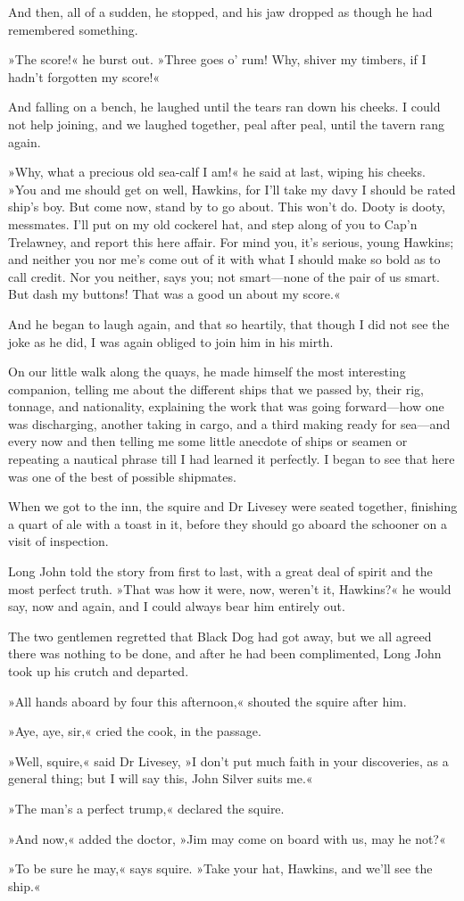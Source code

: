 And then, all of a sudden, he stopped, and his jaw dropped as though he had remembered something.

»The score!« he burst out. »Three goes o' rum! Why, shiver my timbers, if I hadn't forgotten my score!«

And falling on a bench, he laughed until the tears ran down his cheeks. I could not help joining, and we laughed together, peal after peal, until the tavern rang again.

»Why, what a precious old sea-calf I am!« he said at last, wiping his cheeks. »You and me should get on well, Hawkins, for I'll take my davy I should be rated ship's boy. But come now, stand by to go about. This won't do. Dooty is dooty, messmates. I'll put on my old cockerel hat, and step along of you to Cap'n Trelawney, and report this here affair. For mind you, it's serious, young Hawkins; and neither you nor me's come out of it with what I should make so bold as to call credit. Nor you neither, says you; not smart—none of the pair of us smart. But dash my buttons! That was a good un about my score.«

And he began to laugh again, and that so heartily, that though I did not see the joke as he did, I was again obliged to join him in his mirth.

On our little walk along the quays, he made himself the most interesting companion, telling me about the different ships that we passed by, their rig, tonnage, and nationality, explaining the work that was going forward—how one was discharging, another taking in cargo, and a third making ready for sea—and every now and then telling me some little anecdote of ships or seamen or repeating a nautical phrase till I had learned it perfectly. I began to see that here was one of the best of possible shipmates.

When we got to the inn, the squire and Dr Livesey were seated together, finishing a quart of ale with a toast in it, before they should go aboard the schooner on a visit of inspection.

Long John told the story from first to last, with a great deal of spirit and the most perfect truth. »That was how it were, now, weren't it, Hawkins?« he would say, now and again, and I could always bear him entirely out.

The two gentlemen regretted that Black Dog had got away, but we all agreed there was nothing to be done, and after he had been complimented, Long John took up his crutch and departed.

»All hands aboard by four this afternoon,« shouted the squire after him.

»Aye, aye, sir,« cried the cook, in the passage.

»Well, squire,« said Dr Livesey, »I don't put much faith in your discoveries, as a general thing; but I will say this, John Silver suits me.«

»The man's a perfect trump,« declared the squire.

»And now,« added the doctor, »Jim may come on board with us, may he not?«

»To be sure he may,« says squire. »Take your hat, Hawkins, and we'll see the ship.«